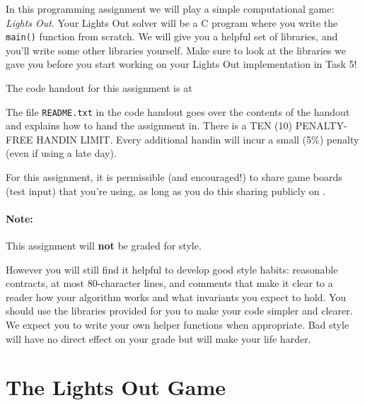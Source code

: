 \documentclass[12pt]{exam}
\begin{document}
\hwTitle

\noindent
In this programming assignment we will play a simple computational
game: \emph{Lights Out}. Your Lights Out solver will be a C program
where you write the \lstinline'main()' function from scratch. We will
give you a helpful set of libraries, and you'll write some other
libraries yourself. Make sure to look at the libraries we gave you
before you start working on your Lights Out implementation in Task 5!

\bigskip
\noindent
The code handout for this assignment is at
\begin{center}
\end{center}
The file \lstinline'README.txt' in the code handout goes over the
contents of the handout and explains how to hand the assignment in.
There is a TEN (10) PENALTY-FREE HANDIN LIMIT.
Every additional handin will incur a small (5\%) penalty (even if
using a late day).

\bigskip
\noindent
For this assignment, it is permissible (and encouraged!) to share
game boards (test input) that you're using, as long as you do this sharing
publicly on \qatool{}.

\paragraph{Note:}
This assignment will \textbf{not} be graded for style.

\noindent
However you will still find it helpful to develop good style habits:
reasonable contracts, at most 80-character lines, and comments that
make it clear to a reader how your algorithm works and what invariants
you expect to hold. You should use the libraries provided for you to
make your code simpler and clearer. We expect you to write your own
helper functions when appropriate.  Bad style will have no direct
effect on your grade but will make your life harder.


\clearpage
\section*{The Lights Out Game}
\label{sec:intro}
\end{document}
